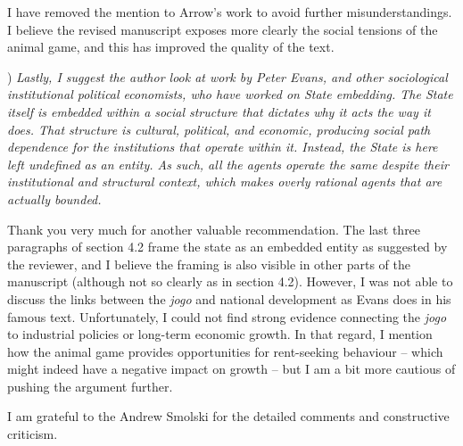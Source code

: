 \documentclass[a4paper,12pt]{article}
\begin{document}
I have removed the mention to Arrow's work to avoid further misunderstandings. I believe the revised manuscript exposes more clearly the social tensions of the animal game, and this has improved the quality of the text. 

\vspace{.5cm}

) \textit{Lastly, I suggest the author look at work by Peter Evans, and other sociological institutional political economists, who have worked on State embedding. The State itself is embedded within a social structure that dictates why it acts the way it does. That structure is cultural, political, and economic, producing social path dependence for the institutions that operate within it. Instead, the State is here left undefined as an entity. As such, all the agents operate the same despite their institutional and structural context, which makes overly rational agents that are actually bounded.}

\vspace{.25cm}

Thank you very much for another valuable recommendation. The last three paragraphs of section 4.2 frame the state as an embedded entity as suggested by the reviewer, and I believe the framing is also visible in other parts of the manuscript (although not so clearly as in section 4.2). However, I was not able to discuss the links between the \textit{jogo} and national development as Evans does in his famous text. Unfortunately, I could not find strong evidence connecting the \textit{jogo} to industrial policies or long-term economic growth. In that regard, I mention how the animal game provides opportunities for rent-seeking behaviour -- which might indeed have a negative impact on growth -- but I am a bit more cautious of pushing the argument further. 

\vspace{.5cm}

I am grateful to the Andrew Smolski for the detailed comments and constructive criticism.  


\newpage


\end{document}
